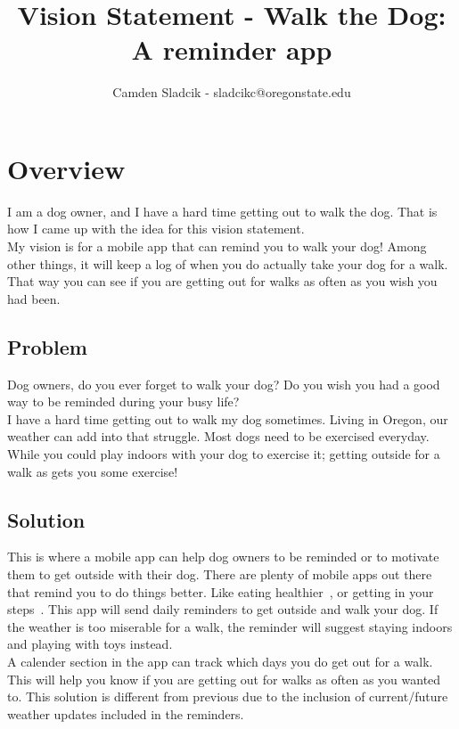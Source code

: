 \documentclass[14pt]{article}
\title{Vision Statement - Walk the Dog: A reminder app}
\author{Camden Sladcik - sladcikc@oregonstate.edu}
\begin{document}
	\maketitle
	\tableofcontents
\newpage	
\section{Overview}
I am a dog owner, and I have a hard time getting out to walk the dog. That is how I came up with the idea for this vision statement.\\
My vision is for a mobile app that can remind you to walk your dog! Among other things, it will keep a log of when you do actually take your dog for a walk. That way you can see if you are getting out for walks as often as you wish you had been.

	 
\subsection{Problem}
Dog owners, do you ever forget to walk your dog? Do you wish you had a good way to be reminded during your busy life?\\
I have a hard time getting out to walk my dog sometimes. Living in Oregon, our weather can add into that struggle. Most dogs need to be exercised everyday. While you could play indoors with your dog to exercise it; getting outside for a walk as gets you some exercise! 

\subsection{Solution}
This is where a mobile app can help dog owners to be reminded or to motivate them to get outside with their dog. There are plenty of mobile apps out there that remind you to do things better. Like eating healthier~\cite{fitnesspal}, or getting in your steps~\cite{stepcounter}. This app will send daily reminders to get outside and walk your dog. If the weather is too miserable for a walk, the reminder will suggest staying indoors and playing with toys instead.\\
A calender section in the app can track which days you do get out for a walk. This will help you know if you are getting out for walks as often as you wanted to. This solution is different from previous due to the inclusion of current/future weather updates included in the reminders.
\end{document}
